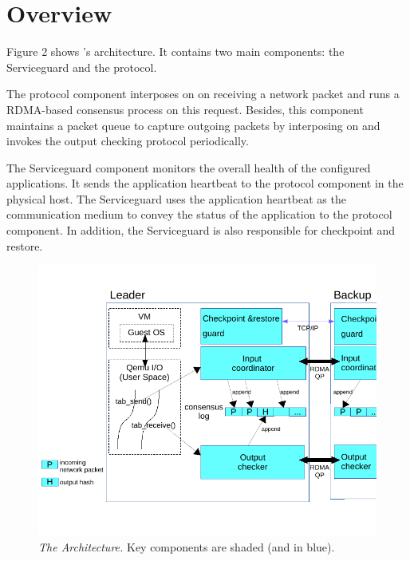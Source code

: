 \section{\xxx Overview} \label{sec:overview}

Figure 2 shows \xxx's architecture. It contains two main components: 
the Serviceguard and the protocol. 

The protocol component interposes on \tapsend on receiving a network packet 
and runs a RDMA-based consensus process on this request. Besides, this component 
maintains a packet queue to capture outgoing packets by interposing on 
\taprecv and invokes the output checking protocol periodically. 

The Serviceguard component monitors the overall health of the configured applications. 
It sends the application heartbeat to the protocol component in the physical 
host. The Serviceguard uses the application heartbeat as the communication 
medium to convey the status of the application to the protocol component. 
In addition, the Serviceguard is also responsible for checkpoint and restore. 


\begin{figure}[t]
\centering
\includegraphics[width=.47\textwidth]{figures/arch}
\vspace{-.2in}
\caption{{\em The \xxx Architecture.} Key components are shaded (and
in blue).} \label{fig:arc}
\vspace{.05in}
\end{figure}
